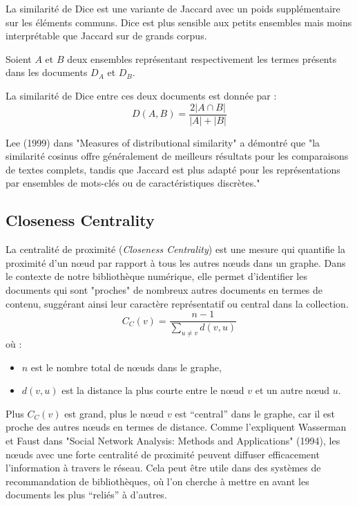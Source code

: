 \documentclass{article}
\begin{document}
    La similarité de Dice est une variante de Jaccard avec un poids supplémentaire sur les éléments communs. Dice est plus sensible aux petits ensembles mais moins interprétable que Jaccard sur de grands corpus.
    
    Soient \( A \) et \( B \) deux ensembles représentant respectivement les termes présents dans les documents \( D_A \) et \( D_B \).
    
    La similarité de Dice entre ces deux documents est donnée par :
    \[
        D(A, B) = \frac{2 |A \cap B|}{|A| + |B|}
    \]

    Lee (1999)\cite{lee2000measures}  dans "Measures of distributional similarity" a démontré que "la similarité cosinus offre généralement de meilleurs résultats pour les comparaisons de textes complets, tandis que Jaccard est plus adapté pour les représentations par ensembles de mots-clés ou de caractéristiques discrètes."

    \subsection{ Closeness Centrality }
    La centralité de proximité (\textit{Closeness Centrality}) est une mesure qui quantifie la proximité d'un nœud par rapport à tous les autres nœuds dans un graphe. Dans le contexte de notre bibliothèque numérique, elle permet d'identifier les documents qui sont "proches" de nombreux autres documents en termes de contenu, suggérant ainsi leur caractère représentatif ou central dans la collection.
    \[
        C_C(v) = \frac{n - 1}{\sum_{u \neq v} d(v, u)}
    \]
    où :
    \begin{itemize}
        \item $n$ est le nombre total de nœuds dans le graphe,
        \item $d(v, u)$ est la distance la plus courte entre le nœud $v$ et un autre nœud $u$.
    \end{itemize}
    Plus $C_C(v)$ est grand, plus le nœud $v$ est “central” dans le graphe, car il est proche des autres nœuds en termes de distance. Comme l'expliquent Wasserman et Faust dans "Social Network Analysis: Methods and Applications" (1994)\cite{wasserman1994social}, les nœuds avec une forte centralité de proximité peuvent diffuser efficacement l'information à travers le réseau. Cela peut être utile dans des systèmes de recommandation de bibliothèques, où l’on cherche à mettre en avant les documents les plus “reliés” à d’autres.
\end{document}
